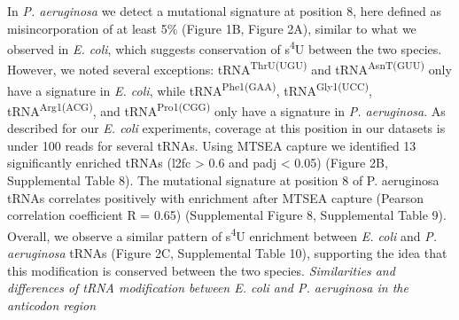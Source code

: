 \documentclass[times, twoside]{zHenriquesLab-StyleBioRxiv}
\begin{document}
In \textit{P. aeruginosa} we detect a mutational signature at position 8, here defined as misincorporation of at least 5\% (Figure 1B, Figure 2A), similar to what we observed in \textit{E. coli}, which suggests conservation of s\textsuperscript{4}U between the two species. However, we noted several exceptions:  tRNA\textsuperscript{ThrU(UGU)} and tRNA\textsuperscript{AsnT(GUU)} only have a signature in \textit{E. coli}, while tRNA\textsuperscript{Phe1(GAA)}, tRNA\textsuperscript{Gly1(UCC)}, tRNA\textsuperscript{Arg1(ACG)}, and tRNA\textsuperscript{Pro1(CGG)} only have a signature  in \textit{P. aeruginosa}. As described for our \textit{E. coli} experiments, coverage at this position in our datasets is under 100 reads for several tRNAs. Using MTSEA capture we identified 13 significantly enriched tRNAs (l2fc > 0.6 and padj < 0.05) (Figure 2B, Supplemental Table 8). The mutational signature at position 8 of P. aeruginosa tRNAs correlates positively with enrichment after MTSEA capture (Pearson correlation coefficient R = 0.65) (Supplemental Figure 8, Supplemental Table 9). Overall, we observe a similar pattern of s\textsuperscript{4}U enrichment between \textit{E. coli} and \textit{P. aeruginosa} tRNAs (Figure 2C, Supplemental Table 10), supporting the idea that this modification is conserved between the two species.  
\newline
\newline
\textit{Similarities and differences of tRNA modification between E. coli and P. aeruginosa in the anticodon region} \newline
\end{document}
